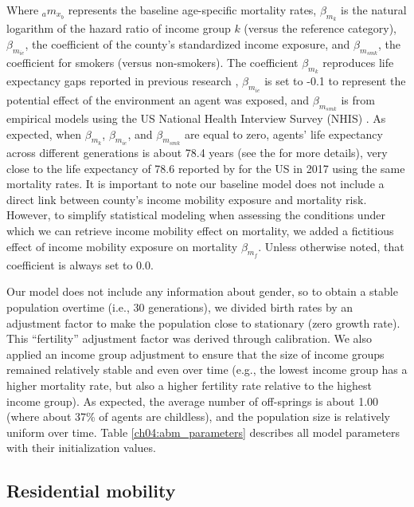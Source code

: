 \documentclass[class=article, crop=false, 12pt]{standalone}
\begin{document}
Where $_am_{x_{b}}$ represents the baseline age-specific mortality rates, $\beta_{m_{k}}$ is the natural logarithm of the hazard ratio of income group $k$ (versus the reference category), $\beta_{m_{ie}}$, the coefficient of the county's standardized income exposure, and $\beta_{m_{smk}}$, the coefficient for smokers (versus non-smokers). The coefficient $\beta_{m_{k}}$ reproduces life expectancy gaps reported in previous research \citep{chetty2016}, $\beta_{m_{ie}}$ is set to -0.1 to represent the potential effect of the environment an agent was exposed, and $\beta_{m_{smk}}$ is from empirical models using the US National Health Interview Survey (NHIS) \citep{jha2013}. As expected, when $\beta_{m_{k}}$, $\beta_{m_{ie}}$, and $\beta_{m_{smk}}$ are equal to zero, agents' life expectancy across different generations is about 78.4 years (see the \textit{} for more details), very close to the life expectancy of 78.6 reported by \citet{kochanek2019} for the US in 2017 using the same mortality rates. It is important to note our baseline model does not include a direct link between county's income mobility exposure and mortality risk. However, to simplify statistical modeling when assessing the conditions under which we can retrieve income mobility effect on mortality, we added a fictitious effect of income mobility exposure on mortality $\beta_{m_{f}}$. Unless otherwise noted, that coefficient is always set to 0.0. 

Our  model does not include any information about gender, so to obtain a stable population overtime (i.e., 30 generations), we divided birth rates by an adjustment factor to make the population close to stationary (zero growth rate). This ``fertility'' adjustment factor was derived through calibration. We also applied an income group adjustment to ensure that the size of income groups remained relatively stable and even over time (e.g., the lowest income group has a higher mortality rate, but also a higher fertility rate relative to the highest income group). As expected, the average number of off-springs is about 1.00 (where about 37\% of agents are childless), and the population size is relatively uniform over time. Table \ref{ch04:abm_parameters} describes all model parameters with their initialization values.

\subsection{Residential mobility}
\end{document}
